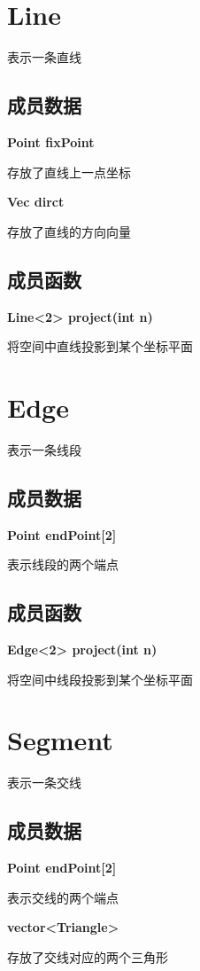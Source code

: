 \documentclass[a4paper]{book}
\numberwithin{equation}{chapter}
\theoremstyle{definition}
\begin{document}
\section{Line}
表示一条直线


\subsection{成员数据}
\textbf{Point fixPoint}

存放了直线上一点坐标

\textbf{Vec dirct}

存放了直线的方向向量


\subsection{成员函数}
\textbf{ Line<2> project(int n)}

将空间中直线投影到某个坐标平面


\section{Edge}
表示一条线段


\subsection{成员数据}
\textbf{Point endPoint[2]}

表示线段的两个端点



\subsection{成员函数}
\textbf{Edge<2> project(int n) }

将空间中线段投影到某个坐标平面


\section{Segment}
表示一条交线


\subsection{成员数据}
\textbf{Point endPoint[2]}

表示交线的两个端点

\textbf{vector<Triangle>}

存放了交线对应的两个三角形
\end{document}
